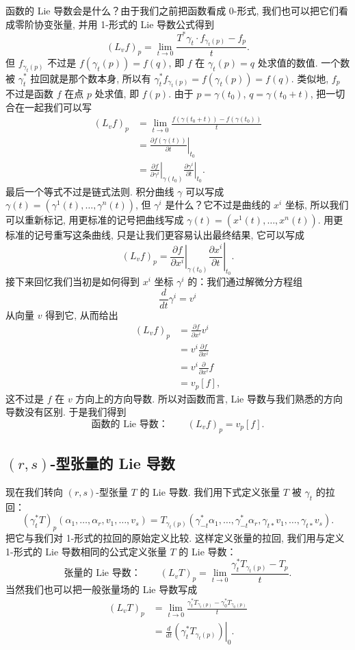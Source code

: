 函数的 Lie 导数会是什么？由于我们之前把函数看成 0-形式, 我们也可以把它们看成零阶协变张量, 并用 1-形式的 Lie 导数公式得到
\[
(L_vf)_p=\lim_{t\to0}\frac{T^*\gamma_t\cdot f_{\gamma_t(p)}-f_p}{t}.
\]
但 $f_{\gamma_t(p)}$ 不过是 $f\left(\gamma_t(p)\right)=f(q)$, 即 $f$ 在 $\gamma_t(p)=q$ 处求值的数值. 一个数被 $\gamma_t^*$ 拉回就是那个数本身, 所以有 $\gamma_t^*f_{\gamma_t(p)}=f\left(\gamma_t(p)\right)=f(q)$. 类似地, $f_p$ 不过是函数 $f$ 在点 $p$ 处求值, 即 $f(p)$. 由于 $p=\gamma(t_0)$, $q=\gamma(t_0+t)$, 把一切合在一起我们可以写
\begin{align*}
(L_vf)_p&=\lim_{t\to0}\frac{f\left(\gamma(t_0+t)\right)-f\left(\gamma(t_0)\right)}{t}\\
&=\left.\frac{\partial f\left(\gamma(t)\right)}{\partial t}\right|_{t_0}\\
&=\left.\frac{\partial f}{\partial\gamma^i}\right|_{\gamma(t_0)}\left.\frac{\partial\gamma^i}{\partial t}\right|_{t_0}.
\end{align*}
最后一个等式不过是链式法则. 积分曲线 $\gamma$ 可以写成 $\gamma(t)=\left(\gamma^1(t),\ldots,\gamma^n(t)\right)$, 但 $\gamma^i$ 是什么？它不过是曲线的 $x^i$ 坐标, 所以我们可以重新标记, 用更标准的记号把曲线写成 $\gamma(t)=\left(x^1(t),\ldots,x^n(t)\right)$. 用更标准的记号重写这条曲线, 只是让我们更容易认出最终结果, 它可以写成
\[
(L_vf)_p=\left.\frac{\partial f}{\partial x^i}\right|_{\gamma(t_0)}\left.\frac{\partial x^i}{\partial t}\right|_{t_0}.
\]
接下来回忆我们当初是如何得到 $x^i$ 坐标 $\gamma^i$ 的：我们通过解微分方程组
\[
\frac{d}{dt}\gamma^i=v^i
\]
从向量 $v$ 得到它, 从而给出
\begin{align*}
(L_vf)_p&=\frac{\partial f}{\partial x^i}v^i\\
&=v^i\frac{\partial f}{\partial x^i}\\
&=v^i\frac{\partial}{\partial x^i}f\\
&=v_p[f],
\end{align*}
这不过是 $f$ 在 $v$ 方向上的方向导数. 所以对函数而言, Lie 导数与我们熟悉的方向导数没有区别. 于是我们得到
\[
\text{函数的 Lie 导数：}\qquad (L_vf)_p=v_p[f].
\]

\subsection{$(r,s)$-型张量的 Lie 导数}

现在我们转向 $(r,s)$-型张量 $T$ 的 Lie 导数. 我们用下式定义张量 $T$ 被 $\gamma_t$ 的拉回：
\[
\left(\gamma_t^*T\right)_p\left(\alpha_1,\ldots,\alpha_r,v_1,\ldots,v_s\right)
=T_{\gamma_t(p)}\left(\gamma_{-t}^*\alpha_1,\ldots,\gamma_{-t}^*\alpha_r,\gamma_{t*}v_1,\ldots,\gamma_{t*}v_s\right).
\]
把它与我们对 1-形式的拉回的原始定义比较. 这样定义张量的拉回, 我们用与定义 1-形式的 Lie 导数相同的公式定义张量 $T$ 的 Lie 导数：
\[
\text{张量的 Lie 导数：}\qquad (L_vT)_p=\lim_{t\to0}\frac{\gamma_t^*T_{\gamma_t(p)}-T_p}{t}.
\]
当然我们也可以把一般张量场的 Lie 导数写成
\begin{align*}
(L_vT)_p&=\lim_{t\to0}\frac{\gamma_t^*T_{\gamma_t(p)}-\gamma_0^*T_{\gamma_0(p)}}{t}\\
&=\left.\frac{d}{dt}\left(\gamma_t^*T_{\gamma_t(p)}\right)\right|_{0}.
\end{align*}

